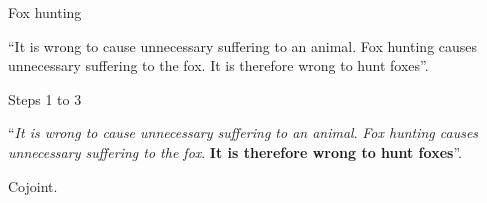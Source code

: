 \documentclass{beamer}
\begin{document}



\begin{frame}{Fox hunting}

``It is wrong to cause unnecessary suffering to an animal. Fox hunting causes unnecessary suffering to the fox. It is therefore wrong to hunt foxes''.

\end{frame}



\begin{frame}{Steps 1 to 3}

``\emph{It is wrong to cause unnecessary suffering to an animal}. \emph{Fox hunting causes unnecessary suffering to the fox}. \textbf{It is therefore wrong to hunt foxes}''.

\vspace{12pt}
Cojoint.

\end{frame}


\end{document}
